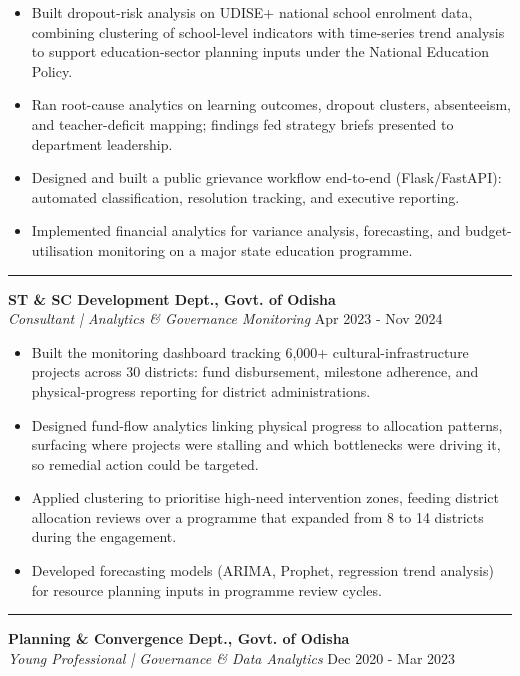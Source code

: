 \documentclass[a4paper,10pt]{article}
\begin{document}
\begin{itemize}
\item Built dropout-risk analysis on UDISE+ national school enrolment data, combining clustering of school-level indicators with time-series trend analysis to support education-sector planning inputs under the National Education Policy.
\item Ran root-cause analytics on learning outcomes, dropout clusters, absenteeism, and teacher-deficit mapping; findings fed strategy briefs presented to department leadership.
\item Designed and built a public grievance workflow end-to-end (Flask/FastAPI): automated classification, resolution tracking, and executive reporting.
\item Implemented financial analytics for variance analysis, forecasting, and budget-utilisation monitoring on a major state education programme.
\end{itemize}

\vspace{1pt}

\noindent\rule{\textwidth}{0.15pt}
{\large\textbf{ST \& SC Development Dept., Govt. of Odisha}} \\
\textit{Consultant | Analytics \& Governance Monitoring} \hfill {\datefont\small Apr 2023 - Nov 2024}

\begin{itemize}
\item Built the monitoring dashboard tracking 6,000+ cultural-infrastructure projects across 30 districts: fund disbursement, milestone adherence, and physical-progress reporting for district administrations.
\item Designed fund-flow analytics linking physical progress to allocation patterns, surfacing where projects were stalling and which bottlenecks were driving it, so remedial action could be targeted.
\item Applied clustering to prioritise high-need intervention zones, feeding district allocation reviews over a programme that expanded from 8 to 14 districts during the engagement.
\item Developed forecasting models (ARIMA, Prophet, regression trend analysis) for resource planning inputs in programme review cycles.
\end{itemize}

\vspace{1pt}

\noindent\rule{\textwidth}{0.15pt}
{\large\textbf{Planning \& Convergence Dept., Govt. of Odisha}} \\
\textit{Young Professional | Governance \& Data Analytics} \hfill {\datefont\small Dec 2020 - Mar 2023}
\end{document}
